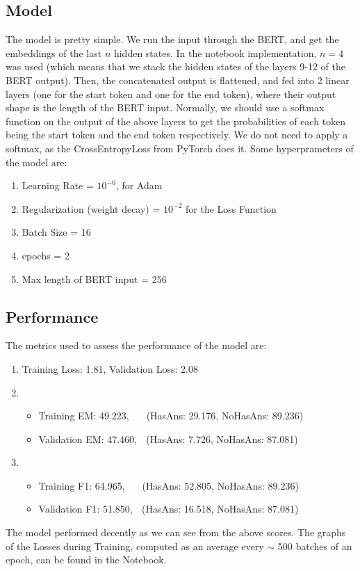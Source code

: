 \documentclass[12pt]{report}
\begin{document}
\subsection*{Model}
The model is pretty simple. We run the input through the BERT, and get the embeddings
of the last $n$ hidden states. In the notebook implementation, $n=4$ was used (which means
that we stack the hidden states of the layers 9-12 of the BERT output). Then, the
concatenated output is flattened, and fed into 2 linear layers (one for the start token
and one for the end token), where their output shape is the length of the BERT input.
Normally, we should use a softmax function on the output of the above layers to get
the probabilities of each token being the start token and the end token respectively.
We do not need to apply a softmax, as the CrossEntropyLoss from PyTorch does it. Some
hyperprameters of the model are:
\begin{enumerate}
    \item Learning Rate = $10^{-6}$, for Adam
    \item Regularization (weight decay) = $10^{-2}$ for the Loss Function
    \item Batch Size = 16
    \item epochs = 2
    \item Max length of BERT input = 256
\end{enumerate}

\subsection*{Performance}
The metrics used to assess the performance of the model are:
\begin{enumerate}
    \item Training Loss: 1.81, Validation Loss: 2.08 
    \item \begin{itemize}
            \item Training EM: 49.223, $\;\;\;\;$ (HasAns: 29.176, NoHasAns: 89.236)
            \item Validation EM: 47.460, $\;$     (HasAns: 7.726, NoHasAns: 87.081)
          \end{itemize}
    \item \begin{itemize}
            \item Training F1: 64.965, $\;\;\;\;$ (HasAns: 52.805, NoHasAns: 89.236)
            \item Validation F1: 51.850, $\;$     (HasAns: 16.518, NoHasAns: 87.081)
          \end{itemize}
\end{enumerate}
The model performed decently as we can see from the above scores. The graphs
of the Losses during Training, computed as an average every $\sim$
500 batches of an epoch, can be found in the Notebook. \clearpage
\end{document}
